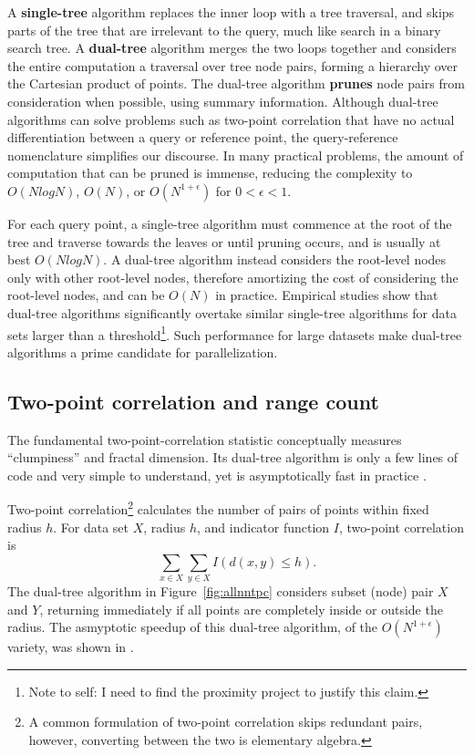 \documentclass[twoside,leqno,twocolumn]{article}
\newcommand{\authornote}[1]{\footnote{Note to self: #1}}
\newcommand{\authorsnote}[1]{\authornote{#1}}
\newcommand{\fig}[1]{Figure~\ref{fig:#1}}
\newcommand{\mysub}[1]{\subsection{#1} }
\newcommand{\defterm}[1]{{\bf #1}}
\begin{document}
A \defterm{single-tree} algorithm replaces the inner loop with a tree traversal, and skips parts of the tree that are irrelevant to the query, much like search in a binary search tree.
A \defterm{dual-tree} algorithm merges the two loops together and considers the entire computation a traversal over tree node pairs, forming a hierarchy over the Cartesian product of points.
The dual-tree algorithm \defterm{prunes} node pairs from consideration when possible, using summary information.
Although dual-tree algorithms can solve problems such as two-point correlation that have no actual differentiation between a query or reference point, the query-reference nomenclature simplifies our discourse.
In many practical problems, the amount of computation that can be pruned is immense, reducing the complexity to $O(N log N)$, $O(N)$, or $O(N^{1+\epsilon})$ for $0 < \epsilon < 1$.

For each query point, a single-tree algorithm must commence at the root of the tree and traverse towards the leaves or until pruning occurs, and is usually at best $O(N log N)$.
A dual-tree algorithm instead considers the root-level nodes only with other root-level nodes, therefore amortizing the cost of considering the root-level nodes, and can be $O(N)$ in practice.
Empirical studies show that dual-tree algorithms significantly overtake similar single-tree algorithms for data sets larger than a threshold\authorsnote{I need to find the proximity project to justify this claim.}.
Such performance for large datasets make dual-tree algorithms a prime candidate for parallelization.

\mysub{Two-point correlation and range count}
The fundamental two-point-correlation statistic conceptually measures ``clumpiness'' and fractal dimension.
Its dual-tree algorithm is only a few lines of code and very simple to understand, yet is asymptotically fast in practice \cite{gray_nbody}.

Two-point correlation\footnote{A common formulation of two-point correlation skips redundant pairs, however, converting between the two is elementary algebra.} calculates the number of pairs of points within fixed radius $h$.
For data set $X$, radius $h$, and indicator function $I$, two-point correlation is
\[\sum_{x \in X} \sum_{y \in X} I(d(x, y) \leq h).\]
\noindent
The dual-tree algorithm in \fig{allnntpc} considers subset (node) pair $X$ and $Y$, returning immediately if all points are completely inside or outside the radius.
The asmyptotic speedup of this dual-tree algorithm, of the $O(N^{1+\epsilon})$ variety, was shown in \cite{gray_nbody}.
\end{document}
